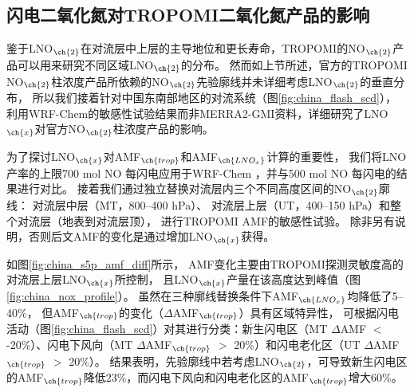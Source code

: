 \subsection{闪电二氧化氮对TROPOMI二氧化氮产品的影响} \label{sec:lno2_affects_tropomi}

鉴于LNO$_{\ch{2}}$在对流层中上层的主导地位和更长寿命，TROPOMI的NO$_{\ch{2}}$产品可以用来研究不同区域LNO$_{\ch{2}}$的分布。
然而如上节所述，官方的TROPOMI NO$_{\ch{2}}$柱浓度产品所依赖的NO$_{\ch{2}}$先验廓线并未详细考虑LNO$_{\ch{2}}$的垂直分布，
所以我们接着针对中国东南部地区的对流系统（图\ref{fig:china_flash_scd}），
利用WRF-Chem的敏感性试验结果而非MERRA2-GMI资料，详细研究了LNO$_{\ch{x}}$对官方NO$_{\ch{2}}$柱浓度产品的影响。

为了探讨LNO$_{\ch{x}}$对AMF$_{\ch{trop}}$和AMF$_{\ch{LNO_x}}$计算的重要性，
我们将LNO产率的上限700 mol NO 每闪电\citep{Ott.2010}应用于WRF-Chem ，并与500 mol NO 每闪电的结果进行对比。
接着我们通过独立替换对流层内三个不同高度区间的NO$_{\ch{2}}$廓线：
对流层中层（MT，800--400 hPa）、
对流层上层（UT，400--150 hPa）和整个对流层（地表到对流层顶），
进行TROPOMI AMF的敏感性试验。
除非另有说明，否则后文AMF的变化是通过增加LNO$_{\ch{x}}$获得。

如图\ref{fig:china_s5p_amf_diff}所示，
AMF变化主要由TROPOMI探测灵敏度高的对流层上层LNO$_{\ch{x}}$所控制\citep{Beirle.2009,Laughner.2017}，
且LNO$_{\ch{x}}$产量在该高度达到峰值（图\ref{fig:china_nox_profile}）。
虽然在三种廓线替换条件下AMF$_{\ch{LNO_x}}$均降低了5--40\%，
但AMF$_{\ch{trop}}$的变化（$\Delta$AMF$_{\ch{trop}}$）具有区域特异性，
可根据闪电活动（图\ref{fig:china_flash_scd}）对其进行分类：新生闪电区（MT $\Delta$AMF $<$ -20\%）、闪电下风向（MT $\Delta$AMF$_{\ch{trop}}$ $>$ 20\%）和闪电老化区（UT $\Delta$AMF$_{\ch{trop}}$ $>$ 20\%）。
结果表明，先验廓线中若考虑LNO$_{\ch{2}}$，可导致新生闪电区的AMF$_{\ch{trop}}$降低23\%，而闪电下风向和闪电老化区的AMF$_{\ch{trop}}$增大60\%。

